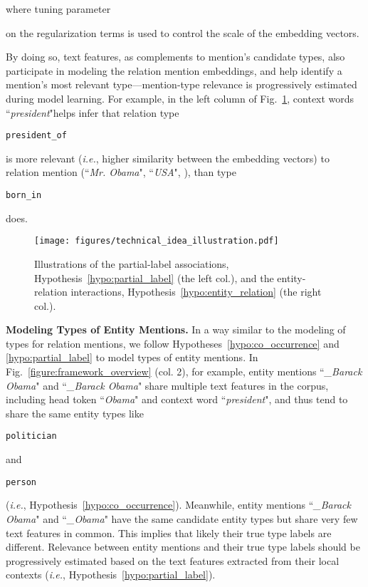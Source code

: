 \documentclass[letterpaper]{sig-alternate-2013}
\def\ie{{\sl i.e.}}
\begin{document}
where tuning parameter \begin{small}\end{small} on the regularization terms is used to control the scale of the embedding vectors.

By doing so, text features, as complements to mention's candidate types, also participate in modeling the relation mention embeddings, and help identify a mention's most relevant type---mention-type relevance is progressively estimated during model learning. For example, in the left column of Fig.~\ref{figure:tech_idea_illustration}, context words ``\textit{president}"helps infer that relation type \begin{small}\texttt{president\_of}\end{small} is more relevant (\ie, higher similarity between the embedding vectors) to relation mention (``\textit{Mr. Obama}", ``\textit{USA}", ), than type \begin{small}\texttt{born\_in}\end{small} does.


\begin{figure}
\centering
\texttt{[image: figures/technical\_idea\_illustration.pdf]}
\caption{Illustrations of the partial-label associations, Hypothesis~\ref{hypo:partial_label} (the left col.), and the entity-relation interactions, Hypothesis~\ref{hypo:entity_relation} (the right col.).}
\label{figure:tech_idea_illustration}
\end{figure}


\medskip
\noindent
\textsf{\small\textbf{Modeling Types of Entity Mentions.}}
In a way similar to the modeling of types for relation mentions, we follow Hypotheses~\ref{hypo:co_occurrence} and \ref{hypo:partial_label} to model types of entity mentions. 
In Fig.~\ref{figure:framework_overview} (col. 2),  for example, entity mentions ``\textit{\_Barack Obama}" and ``\textit{\_Barack Obama}" share multiple text features in the corpus, including head token ``\textit{Obama}" and context word ``\textit{president}", and thus tend to share the same entity types like \begin{small}\texttt{politician}\end{small} and \begin{small}\texttt{person}\end{small} (\ie, Hypothesis~\ref{hypo:co_occurrence}).
Meanwhile, entity mentions ``\textit{\_Barack Obama}" and ``\textit{\_Obama}" have the same candidate entity types but share very few text features in common. This implies that likely their true type labels are different. Relevance between entity mentions and their true type labels should be progressively estimated based on the text features extracted from their local contexts (\ie, Hypothesis~\ref{hypo:partial_label}).
\end{document}
